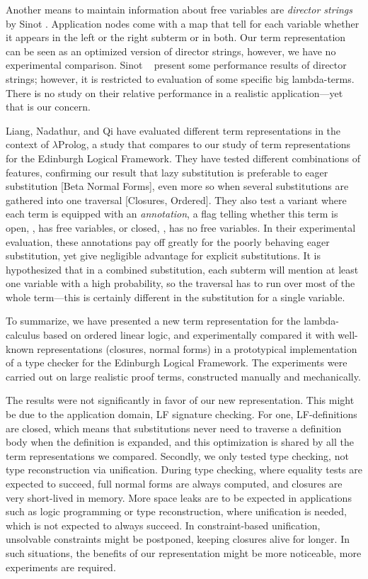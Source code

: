\documentclass[submission,copyright,creativecommons]{eptcs}
\begin{document}
Another means to maintain information about free variables are
\emph{director strings} by Sinot \cite{sinot:jlc05}.  Application
nodes come with a map that tell for each variable whether it appears
in the left or the right subterm or in both.  Our term representation
can be seen as an optimized version of director strings, however, we
have no experimental comparison. 
Sinot \etal~\cite{fernandezMackieSinot:aaecc05} present some
performance results of director strings; however, it is restricted
to evaluation of some specific big lambda-terms.  There is no study on
their relative performance in a realistic application---yet that is
our concern.

Liang, Nadathur, and Qi \cite{liangNadathurQi:jar05} have evaluated
different term representations in the context of $\lambda$Prolog, a
study that compares to our study of term representations for the
Edinburgh Logical Framework.  They have tested different combinations
of features, confirming our result that lazy substitution is 
preferable to eager substitution {[Beta Normal Forms]},
even more so when several substitutions are gathered into one
traversal {[Closures, Ordered]}.  They also test a variant where
each term is equipped with an \emph{annotation}, a flag telling whether
this term is open, \ie, has free variables, or closed, \ie, has no
free variables.  In their experimental evaluation, these annotations
pay off greatly for the poorly behaving eager substitution, yet give
negligible advantage for explicit substitutions.  It is
hypothesized that in a combined substitution, each subterm will
mention at least one variable with a high probability, so the
traversal has to run over most of the whole term---this is certainly
different in the substitution for a single variable.

To summarize, we have presented a new term representation for the
lambda-calculus based on ordered linear logic, and experimentally
compared it with well-known representations (closures, normal forms)
in a prototypical implementation of a type checker for the Edinburgh
Logical Framework.  The experiments were carried out on large realistic
proof terms, constructed manually and mechanically.  

The results were not significantly in favor of our new representation.
This might be due to the application domain, LF signature checking.
For one, LF-definitions are closed, which means that substitutions
never need to traverse a definition body when the definition is
expanded, and this optimization is shared by all the term
representations we compared.  Secondly, we only tested type checking,
not type reconstruction via unification.  During type checking, where
equality tests are expected to succeed, full normal forms are always
computed, and closures are very short-lived in memory.  More space
leaks are to be expected in applications such as logic programming or
type reconstruction, where unification is needed, which is not
expected to always succeed.   In constraint-based unification,
unsolvable constraints might be postponed, keeping closures alive for
longer.  In such situations, the benefits of our representation might
be more noticeable, more experiments are required.
\end{document}
